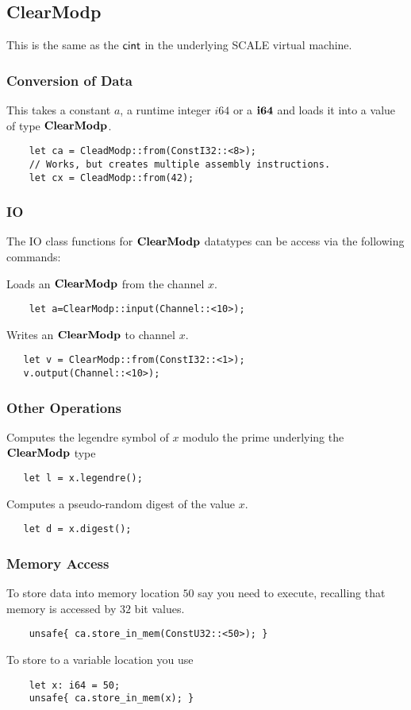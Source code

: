 \subsection{ClearModp}
This is the same as the $\mathsf{cint}$ in the underlying SCALE virtual machine.

\subsubsection{Conversion of Data}
This takes a constant $a$, a runtime integer $i64$ or a $\mathbf{i64}$
and loads it into a value of type $\mathbf{ClearModp}$.
\begin{lstlisting}
    let ca = CleadModp::from(ConstI32::<8>);
    // Works, but creates multiple assembly instructions.
    let cx = CleadModp::from(42);
\end{lstlisting}


\subsubsection{IO}
The IO class functions for $\mathbf{ClearModp}$ datatypes can be access via the following commands:

Loads an $\mathbf{ClearModp}$ from the channel $x$.
\begin{lstlisting}
    let a=ClearModp::input(Channel::<10>);
\end{lstlisting}

Writes an $\mathbf{ClearModp}$ to channel $x$.
\begin{lstlisting}
   let v = ClearModp::from(ConstI32::<1>);
   v.output(Channel::<10>);
\end{lstlisting}


\subsubsection{Other Operations}

Computes the legendre symbol of $x$ modulo the prime underlying the
$\mathbf{ClearModp}$ type
\begin{lstlisting}
   let l = x.legendre();
\end{lstlisting}


Computes a pseudo-random digest of the value $x$.
\begin{lstlisting}
   let d = x.digest();
\end{lstlisting}


\subsubsection{Memory Access}
To store data into memory location $50$ say you need to execute,
recalling that memory is accessed by $32$ bit values.
\begin{lstlisting}
    unsafe{ ca.store_in_mem(ConstU32::<50>); }
\end{lstlisting}
To store to a variable location you use
\begin{lstlisting}
    let x: i64 = 50;
    unsafe{ ca.store_in_mem(x); }
\end{lstlisting}

